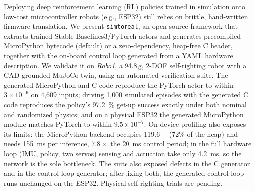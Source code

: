 
Deploying deep reinforcement learning (RL) policies trained in simulation onto low-cost microcontroller robots (e.g., ESP32) still relies on brittle, hand-written firmware translation. We present \texttt{simtoreal}, an open-source framework that extracts trained Stable-Baselines3/PyTorch actors and generates precompiled MicroPython bytecode (default) or a zero-dependency, heap-free C header, together with the on-board control loop generated from a YAML hardware description. We validate it on \textit{Robo1}, a 94.8\,g, 2-DOF self-righting robot with a CAD-grounded MuJoCo twin, using an automated verification suite. The generated MicroPython and C code reproduce the PyTorch actor to within $3\times10^{-6}$ on 4{,}609 inputs; driving 1{,}000 simulated episodes with the generated C code reproduces the policy's \SI{97.2}{\percent} get-up success exactly under both nominal and randomized physics; and on a physical ESP32 the generated MicroPython module matches PyTorch to within $9.5\times10^{-7}$. On-device profiling also exposes its limits: the MicroPython backend occupies \SI{119.6}{\kilo\byte} (72\% of the heap) and needs \SI{155}{\milli\second} per inference, $7.8\times$ the \SI{20}{\milli\second} control period; in the full hardware loop (IMU, policy, two servos) sensing and actuation take only \SI{4.2}{\milli\second}, so the network is the sole bottleneck. The suite also exposed defects in the C generator and in the control-loop generator; after fixing both, the generated control loop runs unchanged on the ESP32. Physical self-righting trials are pending.

